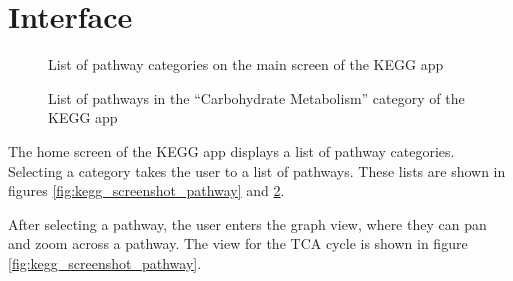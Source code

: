 \section{Interface}
\label{sect:kegg_interface}

\begin{figure}
    \caption{\label{fig:kegg_screenshot_list} List of pathway categories on
    the main screen of the KEGG app}
\end{figure}

\begin{figure}
    \caption{\label{fig:kegg_screenshot_sublist} List of pathways in the
    ``Carbohydrate Metabolism'' category of the KEGG app}
\end{figure}

The home screen of the KEGG app displays a list of pathway categories. Selecting
a category takes the user to a list of pathways. These lists are shown in
figures \ref{fig:kegg_screenshot_pathway} and \ref{fig:kegg_screenshot_sublist}.

After selecting a pathway, the user enters the graph view, where they can pan
and zoom across a pathway. The view for the TCA cycle is shown in figure
\ref{fig:kegg_screenshot_pathway}.

